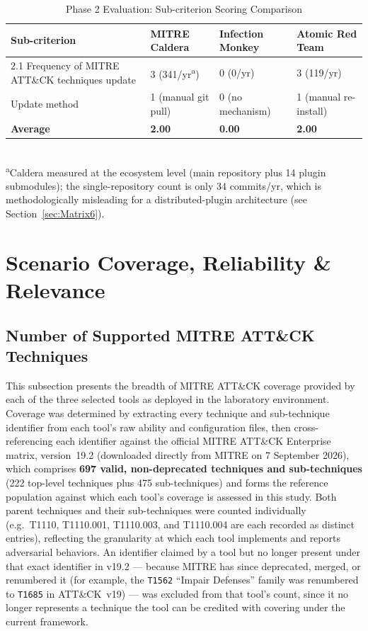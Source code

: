 \begin{table}
    \centering
    \caption{Phase 2 Evaluation: Sub-criterion Scoring Comparison}
    \small
    \begin{tabularx}{\textwidth}{lXXX}
        \toprule
        \textbf{Sub-criterion} & \textbf{MITRE Caldera} & \textbf{Infection Monkey} & \textbf{Atomic Red Team} \\
        \midrule
        2.1 Frequency of MITRE ATT\&CK techniques update & 3 (341/yr\textsuperscript{a}) & 0 (0/yr) & 3 (119/yr) \\
        \addlinespace
        2.2 Update method & 1 (manual git pull) & 0 (no mechanism) & 1 (manual re-install) \\
        \midrule
        \textbf{Average} & \textbf{2.00} & \textbf{0.00} & \textbf{2.00} \\
        \bottomrule
    \end{tabularx}
    \\[4pt]
    \footnotesize\textsuperscript{a}Caldera measured at the ecosystem level (main repository plus 14 plugin submodules); the single-repository count is only 34 commits/yr, which is methodologically misleading for a distributed-plugin architecture (see Section~\ref{sec:Matrix6}).
\end{table}


\section{Scenario Coverage, Reliability \& Relevance}\label{sec:Matrix3}
\subsection{Number of Supported MITRE ATT\&CK Techniques}\label{sec:results_im_3_1}

This subsection presents the breadth of MITRE ATT\&CK coverage provided by each of the three selected tools as deployed in the laboratory
environment. Coverage was determined by extracting every technique and sub-technique
identifier from each tool's raw ability and configuration files, then cross-referencing each identifier against the official MITRE ATT\&CK Enterprise matrix, version~19.2 (downloaded directly from MITRE on 7 September 2026), which comprises \textbf{697 valid, non-deprecated techniques and sub-techniques} (222 top-level techniques plus 475 sub-techniques) and forms the reference population against which each tool's coverage is assessed in this study. Both parent techniques and their sub-techniques were counted individually
(e.g.\ T1110, T1110.001, T1110.003, and T1110.004 are each recorded as distinct entries), reflecting the granularity at which each tool implements and reports adversarial behaviors. An identifier claimed by a tool but no longer present under that exact identifier in v19.2 --- because MITRE has since deprecated, merged, or renumbered it (for example, the \texttt{T1562} ``Impair Defenses'' family was renumbered to \texttt{T1685} in ATT\&CK~v19) --- was excluded from that tool's count, since it no longer represents a technique the tool can be credited with covering under the current framework.

